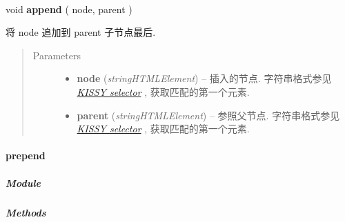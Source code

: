 \documentclass[letterpaper,10pt,english]{sphinxmanual}
\begin{document}
\begin{fulllineitems}
\label{api/core/dom/append:DOM.append}~
\begin{DUlineblock}{0em}
\item[] void \textbf{append} ( node, parent )
\item[] 将 node 追加到 parent 子节点最后.
\end{DUlineblock}
\begin{quote}\begin{description}
\item[{Parameters}] \leavevmode\begin{itemize}
\item {}
\textbf{node} (\emph{string\textbar{}HTMLElement}) -- 插入的节点. 字符串格式参见 {\hyperref[api/core/dom/selector:dom-selector]{\emph{KISSY selector}}} , 获取匹配的第一个元素.

\item {}
\textbf{parent} (\emph{string\textbar{}HTMLElement}) -- 参照父节点. 字符串格式参见 {\hyperref[api/core/dom/selector:dom-selector]{\emph{KISSY selector}}} , 获取匹配的第一个元素.

\end{itemize}

\end{description}\end{quote}

\end{fulllineitems}



\paragraph{prepend}
\label{api/core/dom/prepend::doc}\label{api/core/dom/prepend:prepend}

\subparagraph{Module}
\label{api/core/dom/prepend:module}\begin{quote}

{\hyperref[api/core/dom/index:module-DOM]{}}
\end{quote}


\subparagraph{Methods}
\label{api/core/dom/prepend:methods}
\end{document}
